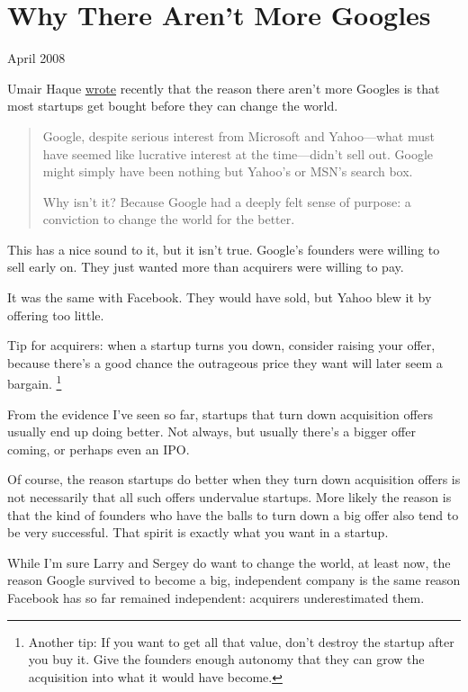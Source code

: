 \chapter{Why There Aren't More Googles}

April 2008

Umair Haque
\href{http://discussionleader.hbsp.com/haque/2008/04/i_agree_and_i.html}{wrote}
recently that the reason there aren't more Googles is that most startups
get bought before they can change the world.

\begin{quote}
Google, despite serious interest from Microsoft and Yahoo---what must
have seemed like lucrative interest at the time---didn't sell out.
Google might simply have been nothing but Yahoo's or MSN's search box.

Why isn't it? Because Google had a deeply felt sense of purpose: a
conviction to change the world for the better.
\end{quote}

This has a nice sound to it, but it isn't true. Google's founders were
willing to sell early on. They just wanted more than acquirers were
willing to pay.

It was the same with Facebook. They would have sold, but Yahoo blew it
by offering too little.

Tip for acquirers: when a startup turns you down, consider raising your
offer, because there's a good chance the outrageous price they want will
later seem a bargain. \footnote{Another tip: If you want to get all that value, don't destroy
the startup after you buy it. Give the founders enough autonomy that
they can grow the acquisition into what it would have become.}

From the evidence I've seen so far, startups that turn down acquisition
offers usually end up doing better. Not always, but usually there's a
bigger offer coming, or perhaps even an IPO.

Of course, the reason startups do better when they turn down acquisition
offers is not necessarily that all such offers undervalue startups. More
likely the reason is that the kind of founders who have the balls to
turn down a big offer also tend to be very successful. That spirit is
exactly what you want in a startup.

While I'm sure Larry and Sergey do want to change the world, at least
now, the reason Google survived to become a big, independent company is
the same reason Facebook has so far remained independent: acquirers
underestimated them.

